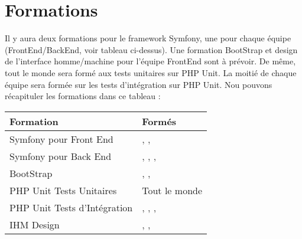\documentclass [a4paper] {article}
\begin{document}
\section{Formations}
Il y aura deux formations pour le framework Symfony, une pour chaque équipe (FrontEnd/BackEnd, voir tableau ci-dessus). Une formation BootStrap et design de l'interface homme/machine pour l'équipe FrontEnd sont à prévoir. De même, tout le monde sera formé aux tests unitaires sur PHP Unit. La moitié de chaque équipe sera formée sur les tests d'intégration sur PHP Unit. Nou pouvons récapituler les formations dans ce tableau : \\
\begin{tabular}{| p{5cm} | p{5cm} |}
		\hline
		\rowcolor{Gray}
		Formation & Formés		 \\
		\hline
		Symfony pour Front End & \Matthieu, \Mathieu, \Julie \\ \hline
		Symfony pour Back End & \Kafui, \Florian, \Michel, \Melissa \\ \hline
		BootStrap & \Matthieu, \Mathieu, \Julie \\ \hline
		PHP Unit Tests Unitaires & Tout le monde \\ \hline
		PHP Unit Tests d'Intégration & \Michel, \Florian, \Kafui, \Matthieu \\ \hline
		IHM Design & \Matthieu, \Mathieu, \Julie \\ \hline
	\end{tabular}
\end{document}
